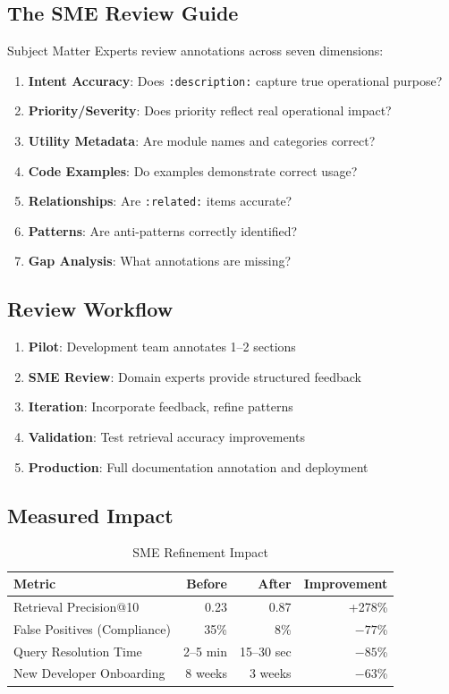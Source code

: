 \documentclass[11pt,letterpaper]{article}
\begin{document}
\subsection{The SME Review Guide}

Subject Matter Experts review annotations across seven dimensions:

\begin{enumerate}
    \item \textbf{Intent Accuracy}: Does \texttt{:description:} capture true operational purpose?
    \item \textbf{Priority/Severity}: Does priority reflect real operational impact?
    \item \textbf{Utility Metadata}: Are module names and categories correct?
    \item \textbf{Code Examples}: Do examples demonstrate correct usage?
    \item \textbf{Relationships}: Are \texttt{:related:} items accurate?
    \item \textbf{Patterns}: Are anti-patterns correctly identified?
    \item \textbf{Gap Analysis}: What annotations are missing?
\end{enumerate}

\subsection{Review Workflow}

\begin{enumerate}
    \item \textbf{Pilot}: Development team annotates 1--2 sections
    \item \textbf{SME Review}: Domain experts provide structured feedback
    \item \textbf{Iteration}: Incorporate feedback, refine patterns
    \item \textbf{Validation}: Test retrieval accuracy improvements
    \item \textbf{Production}: Full documentation annotation and deployment
\end{enumerate}

\subsection{Measured Impact}

\begin{table}[H]
\centering
\caption{SME Refinement Impact}
\begin{tabular}{@{}lrrr@{}}
\toprule
\textbf{Metric} & \textbf{Before} & \textbf{After} & \textbf{Improvement} \\
\midrule
Retrieval Precision@10 & 0.23 & 0.87 & +278\% \\
False Positives (Compliance) & 35\% & 8\% & $-77$\% \\
Query Resolution Time & 2--5 min & 15--30 sec & $-85$\% \\
New Developer Onboarding & 8 weeks & 3 weeks & $-63$\% \\
\bottomrule
\end{tabular}
\end{table}
\end{document}
